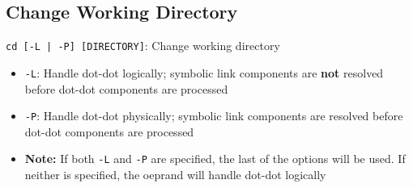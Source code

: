 \documentclass[13pt]{article}
\begin{document}
\subsection{Change Working Directory}
\texttt{cd [-L | -P] [DIRECTORY]}: Change working directory
\begin{itemize}[leftmargin = 0pt]
\item [] \texttt{-L}: Handle dot-dot logically; symbolic link components are \textbf{not} resolved before dot-dot components are processed
\item [] \texttt{-P}: Handle dot-dot physically; symbolic link components are resolved before dot-dot components are processed
\item [] \textbf{Note:} If both \texttt{-L} and \texttt{-P} are specified, the last of the options will be used. If neither is specified, the oeprand will handle dot-dot logically
\end{itemize}
\end{document}
